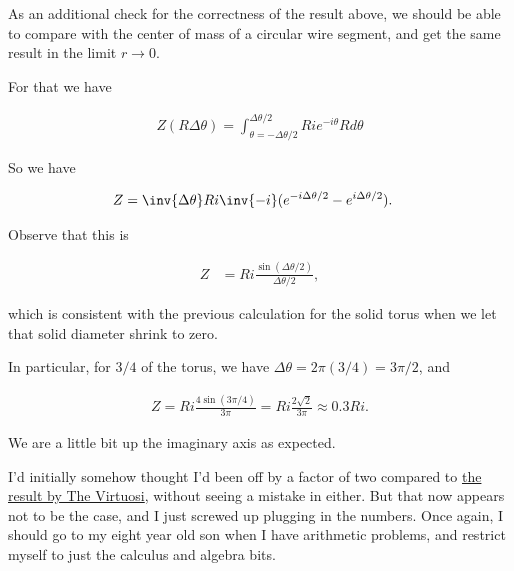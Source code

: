 As an additional check for the correctness of the result above, we should be able to compare with the center of mass of a circular wire segment, and get the same result in the limit $r \rightarrow 0$.

For that we have

\begin{align}\label{eqn:torusCenterOfMass:14}
Z (R \Delta \theta) = \int_{\theta=-\Delta \theta/2}^{\Delta \theta/2} R i e^{-i\theta} R d\theta
\end{align}

So we have

\begin{align}\label{eqn:torusCenterOfMass:15}
Z 
&= \inv{\Delta \theta} R i \inv{-i} (e^{-i\Delta \theta/2} - e^{i\Delta\theta/2}).
\end{align}

Observe that this is

\begin{align}\label{eqn:torusCenterOfMass:16}
Z &= R i \frac{\sin(\Delta\theta/2)}{\Delta\theta/2},
\end{align}

which is consistent with the previous calculation for the solid torus when we let that solid diameter shrink to zero.

In particular, for $3/4$ of the torus, we have $\Delta \theta = 2 \pi (3/4) = 3 \pi/2$, and 

\begin{align}\label{eqn:torusCenterOfMass:17}
Z = R i \frac{4 \sin(3\pi/4)}{3 \pi} = R i \frac{2 \sqrt{2}}{3 \pi} \approx 0.3 R i.
\end{align}

We are a little bit up the imaginary axis as expected.

I'd initially somehow thought I'd been off by a factor of two compared to \href{http://samjshah.com/2010/05/05/i-love-when-kids-stump-me/#comment-2349}{the result by The Virtuosi}, without seeing a mistake in either.  But that now appears not to be the case, and I just screwed up plugging in the numbers.  Once again, I should go to my eight year old son when I have arithmetic problems, and restrict myself to just the calculus and algebra bits.

\EndNoBibArticle
